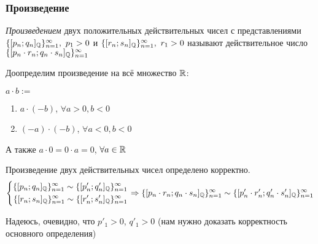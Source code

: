 \subsubsection{Произведение}

\begin{definition}
    \textit{Произведением} двух положительных действительных чисел с представлениями $\{[p_n;q_n]_{\mathbb{Q}}\}_{n = 1}^\infty,\ p_1 > 0$ и $\{[r_n;s_n]_{\mathbb{Q}}\}_{n = 1}^\infty,\ r_1 > 0$ называют действительное число $\{[p_n \cdot r_n;q_n \cdot s_n]_{\mathbb{Q}}\}_{n = 1}^\infty$
\end{definition}

Доопределим произведение на всё множество $\mathbb{R}$:

$a \cdot b :=$
\begin{enumerate}
    \item $a \cdot (-b)$, $\forall a > 0, b < 0$
    \item $(-a) \cdot (-b)$, $\forall a < 0, b < 0$
\end{enumerate}

А также $a \cdot 0 = 0 \cdot a = 0$, $\forall a \in \mathbb{R}$

\begin{proposition}
    Произведение двух действительных чисел определено корректно.
    $$
        \left\{\begin{aligned}\{[p_n; q_n]_{\mathbb{Q}}\}_{n = 1}^\infty \sim \{[p'_n; q'_n]_{\mathbb{Q}}\}_{n = 1}^\infty \\ 
            \{[r_n; s_n]_{\mathbb{Q}}\}_{n = 1}^\infty \sim \{[r'_n; s'_n]_{\mathbb{Q}}\}_{n = 1}^\infty\end{aligned}\right.
    \Rightarrow
    \{[p_n \cdot r_n; q_n \cdot s_n]_{\mathbb{Q}}\}_{n = 1}^\infty \sim \{[p'_n \cdot r'_n; q'_n \cdot s'_n]_{\mathbb{Q}}\}_{n = 1}^\infty
    $$
\end{proposition}

\begin{anote}
    Надеюсь, очевидно, что $p'_1 > 0$, $q'_1 > 0$ (нам нужно доказать корректность основного определения)
\end{anote}

